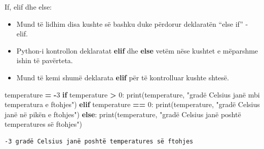 \documentclass[
  ignorenonframetext,
]{beamer}
\newenvironment{Shaded}{\begin{snugshade}}{\end{snugshade}}
\newcommand{\BuiltInTok}[1]{#1}
\newcommand{\ControlFlowTok}[1]{\textcolor[rgb]{0.13,0.29,0.53}{\textbf{#1}}}
\newcommand{\DecValTok}[1]{\textcolor[rgb]{0.00,0.00,0.81}{#1}}
\newcommand{\NormalTok}[1]{#1}
\newcommand{\OperatorTok}[1]{\textcolor[rgb]{0.81,0.36,0.00}{\textbf{#1}}}
\newcommand{\StringTok}[1]{\textcolor[rgb]{0.31,0.60,0.02}{#1}}
\begin{document}
\begin{frame}[fragile]{If, elif dhe else:}
\protect\hypertarget{if-elif-dhe-else}{}
\begin{itemize}
\item
  Mund të lidhim disa kushte së bashku duke përdorur deklaratën ``else
  if'' - elif.
\item
  Python-i kontrollon deklaratat \textbf{elif} dhe \textbf{else} vetëm
  nëse kushtet e mëparshme ishin të pavërteta.
\item
  Mund të kemi shumë deklarata \textbf{elif} për të kontrolluar kushte
  shtesë.
\end{itemize}

\begin{Shaded}
\begin{Highlighting}[]
\NormalTok{temperature }\OperatorTok{=} \OperatorTok{{-}}\DecValTok{3}
\ControlFlowTok{if}\NormalTok{ temperature }\OperatorTok{\textgreater{}} \DecValTok{0}\NormalTok{:}
    \BuiltInTok{print}\NormalTok{(temperature, }\StringTok{"gradë Celsius janë mbi temperatura e ftohjes"}\NormalTok{)}
\ControlFlowTok{elif}\NormalTok{ temperature }\OperatorTok{==} \DecValTok{0}\NormalTok{:}
    \BuiltInTok{print}\NormalTok{(temperature, }\StringTok{"gradë Celsius janë në pikën e ftohjes"}\NormalTok{)}
\ControlFlowTok{else}\NormalTok{:}
    \BuiltInTok{print}\NormalTok{(temperature, }\StringTok{"gradë Celsius janë poshtë temperatures së ftohjes"}\NormalTok{)}
\end{Highlighting}
\end{Shaded}

\begin{verbatim}
-3 gradë Celsius janë poshtë temperatures së ftohjes
\end{verbatim}
\end{frame}
\end{document}
